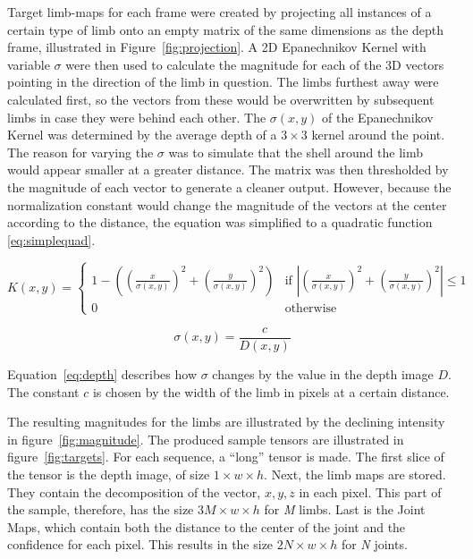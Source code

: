 Target limb-maps for each frame were created by projecting all instances of a certain type of limb onto an empty matrix of the same dimensions as the depth frame, illustrated in Figure~\ref{fig:projection}. A 2D Epanechnikov Kernel with variable $\sigma$ were then used to calculate the magnitude for each of the 3D vectors pointing in the direction of the limb in question. The limbs furthest away were calculated first, so the vectors from these would be overwritten by subsequent limbs in case they were behind each other. The $\sigma(x, y)$ of the Epanechnikov Kernel was determined by the average depth of a $3 \times 3$ kernel around the point. The reason for varying the $\sigma$ was to simulate that the shell around the limb would appear smaller at a greater distance. The matrix was then thresholded by the magnitude of each vector to generate a cleaner output. However, because the normalization constant would change the magnitude of the vectors at the center according to the distance, the equation was simplified to a quadratic function \ref{eq:simplequad}.

\begin{equation}
  \label{eq:simplequad}
  K(x, y) =
  \begin{cases}
    1 - ((\frac{x}{\sigma(x, y)})^{2} + (\frac{y}{\sigma(x, y)})^{2}) & \text{if } |(\frac{x}{\sigma(x, y)})^{2} + (\frac{y}{\sigma(x, y)})^{2}| \leq 1\\
    0 & \text{otherwise}
  \end{cases}
\end{equation}

\begin{equation}
  \label{eq:depth}
  \sigma(x, y) = \frac{c}{D(x, y)}
\end{equation}

Equation~\ref{eq:depth} describes how $\sigma$ changes by the value in the depth image $D$. The constant $c$ is chosen by the width of the limb in pixels at a certain distance.

The resulting magnitudes for the limbs are illustrated by the declining intensity in figure~\ref{fig:magnitude}. The produced sample tensors are illustrated in figure~\ref{fig:targets}. For each sequence, a ``long'' tensor is made. The first slice of the tensor is the depth image, of size $1 \times w \times h$. Next, the limb maps are stored. They contain the decomposition of the vector, $x, y, z$ in each pixel. This part of the sample, therefore, has the size $3M \times w \times h$ for \emph{M} limbs. Last is the Joint Maps, which contain both the distance to the center of the joint and the confidence for each pixel. This results in the size $2N \times w \times h$ for \emph{N} joints.

